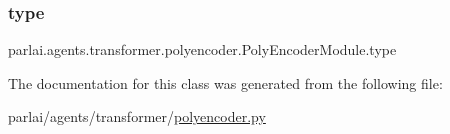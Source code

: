 \subsubsection{\texorpdfstring{type}{type}}
{\footnotesize\ttfamily parlai.\+agents.\+transformer.\+polyencoder.\+Poly\+Encoder\+Module.\+type}



The documentation for this class was generated from the following file\+:\begin{DoxyCompactItemize}
\item 
parlai/agents/transformer/\hyperlink{polyencoder_8py}{polyencoder.\+py}\end{DoxyCompactItemize}
